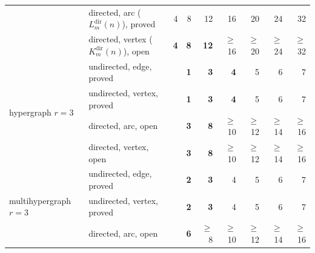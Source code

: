 \begin{tabular}{llrrrrrrr}
 & directed, arc ($L_m^{\mathrm{dir}}(n)$), \textcolor{vtProved}{proved} & \textcolor{vtProved}{4} & \textcolor{vtProved}{8} & \textcolor{vtProved}{12} & \textcolor{vtProved}{16} & \textcolor{vtProved}{20} & \textcolor{vtProved}{24} & \textcolor{vtProved}{32} \\
 & directed, vertex ($K_m^{\mathrm{dir}}(n)$), \textcolor{vtOpen}{open} & \textcolor{vtExact}{\textbf{4}} & \textcolor{vtExact}{\textbf{8}} & \textcolor{vtExact}{\textbf{12}} & \textcolor{vtOpen}{$\ge$16} & \textcolor{vtOpen}{$\ge$20} & \textcolor{vtOpen}{$\ge$24} & \textcolor{vtOpen}{$\ge$32} \\
\midrule
\multirow{4}{*}{hypergraph $r=3$} & undirected, edge, \textcolor{vtProved}{proved} &  & \textcolor{vtExact}{\textbf{1}} & \textcolor{vtExact}{\textbf{3}} & \textcolor{vtExact}{\textbf{4}} & \textcolor{vtProved}{5} & \textcolor{vtProved}{6} & \textcolor{vtProved}{7} \\
 & undirected, vertex, \textcolor{vtProved}{proved} &  & \textcolor{vtExact}{\textbf{1}} & \textcolor{vtExact}{\textbf{3}} & \textcolor{vtExact}{\textbf{4}} & \textcolor{vtProved}{5} & \textcolor{vtProved}{6} & \textcolor{vtProved}{7} \\
 & directed, arc, \textcolor{vtOpen}{open} &  & \textcolor{vtExact}{\textbf{3}} & \textcolor{vtExact}{\textbf{8}} & \textcolor{vtOpen}{$\ge$10} & \textcolor{vtOpen}{$\ge$12} & \textcolor{vtOpen}{$\ge$14} & \textcolor{vtOpen}{$\ge$16} \\
 & directed, vertex, \textcolor{vtOpen}{open} &  & \textcolor{vtExact}{\textbf{3}} & \textcolor{vtExact}{\textbf{8}} & \textcolor{vtOpen}{$\ge$10} & \textcolor{vtOpen}{$\ge$12} & \textcolor{vtOpen}{$\ge$14} & \textcolor{vtOpen}{$\ge$16} \\
\midrule
\multirow{4}{*}{multihypergraph $r=3$} & undirected, edge, \textcolor{vtProved}{proved} &  & \textcolor{vtExact}{\textbf{2}} & \textcolor{vtExact}{\textbf{3}} & \textcolor{vtProved}{4} & \textcolor{vtProved}{5} & \textcolor{vtProved}{6} & \textcolor{vtProved}{7} \\
 & undirected, vertex, \textcolor{vtProved}{proved} &  & \textcolor{vtExact}{\textbf{2}} & \textcolor{vtExact}{\textbf{3}} & \textcolor{vtProved}{4} & \textcolor{vtProved}{5} & \textcolor{vtProved}{6} & \textcolor{vtProved}{7} \\
 & directed, arc, \textcolor{vtOpen}{open} &  & \textcolor{vtExact}{\textbf{6}} & \textcolor{vtOpen}{$\ge$8} & \textcolor{vtOpen}{$\ge$10} & \textcolor{vtOpen}{$\ge$12} & \textcolor{vtOpen}{$\ge$14} & \textcolor{vtOpen}{$\ge$16} \\

\end{tabular}
